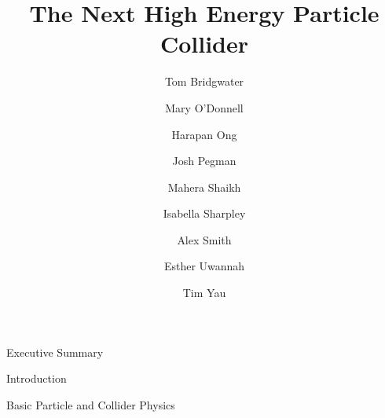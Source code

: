 \documentclass[12pt]{article}
\begin{document}
    \begin{titlepage}
    
     \author{
         Tom Bridgwater \and
         Mary O'Donnell \and
         Harapan Ong \and
         Josh Pegman \and
         Mahera Shaikh \and
         Isabella Sharpley \and
         Alex Smith \and
         Esther Uwannah \and
         Tim Yau
     }
     
     \title{The Next High Energy Particle Collider}
     
     \maketitle
     
    
    \end{titlepage}
 
 \clearpage
 
 \setcounter{tocdepth}{2}
 \tableofcontents
 
 \clearpage
 
 \begin{section}{Executive Summary}
 	 
 \end{section}
 
 \begin{section}{Introduction}
     
 \end{section}

 \begin{section}{Basic Particle and Collider Physics}
     
     
 \end{section}
 
\end{document}
